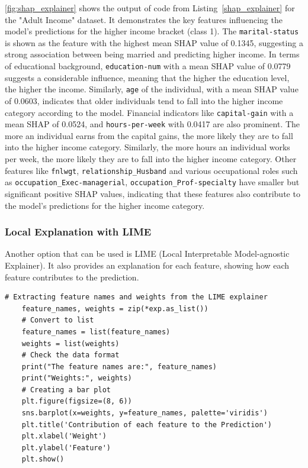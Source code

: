 \documentclass[10pt,journal,compsoc]{IEEEtran}
\begin{document}
\autoref{fig:shap_explainer} shows the output of code from Listing~\ref{shap_explainer} for the "Adult Income" dataset. It demonstrates the key features influencing the model's predictions for the higher income bracket (class 1).
The \texttt{marital-status} is shown as the feature with the highest mean SHAP value of 0.1345, suggesting a strong association between being married and predicting higher income.
In terms of educational background, \texttt{education-num} with a mean SHAP value of 0.0779 suggests a considerable influence, meaning that the higher the education level, the higher the income. Similarly, 
\texttt{age} of the individual, with a mean SHAP value of 0.0603, indicates that older individuals tend to fall into the higher income category according to the model.
Financial indicators like \texttt{capital-gain} with a mean SHAP of 0.0524, and \texttt{hours-per-week} with 0.0417 are also prominent.
The more an individual earns from the capital gains, the more likely they are to fall into the higher income category. Similarly, the more hours an individual works per week, the more likely they are to fall into the higher income category.
Other features like \texttt{fnlwgt}, \texttt{relationship\_Husband} and various occupational roles such as \texttt{occupation\_Exec-managerial}, \texttt{occupation\_Prof-specialty} have smaller but significant positive SHAP values, indicating that these features also contribute to the model's predictions for the higher income category.


\subsubsection{Local Explanation with LIME}

Another option that can be used is LIME (Local Interpretable Model-agnostic Explainer). It also provides an explanation for each feature, showing how each feature contributes to the prediction.


\begin{lstlisting}[caption=LIME Explainer , label=lime_explainer]
    # Extracting feature names and weights from the LIME explainer
    feature_names, weights = zip(*exp.as_list())    
    # Convert to list
    feature_names = list(feature_names)
    weights = list(weights)    
    # Check the data format
    print("The feature names are:", feature_names)
    print("Weights:", weights)    
    # Creating a bar plot
    plt.figure(figsize=(8, 6))
    sns.barplot(x=weights, y=feature_names, palette='viridis')
    plt.title('Contribution of each feature to the Prediction')
    plt.xlabel('Weight')
    plt.ylabel('Feature')
    plt.show()
\end{lstlisting}
\end{document}
